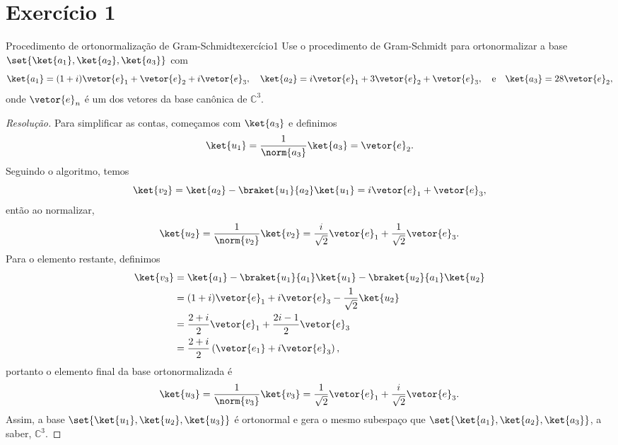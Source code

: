 \section*{Exercício 1}
\begin{exercício}{Procedimento de ortonormalização de Gram-Schmidt}{exercício1}
    Use o procedimento de Gram-Schmidt para ortonormalizar a base \(\set{\ket{a_1}, \ket{a_2}, \ket{a_3}}\) com
    \begin{equation*}
        \ket{a_1} = (1 + i)\vetor{e}_1 + \vetor{e}_2 + i \vetor{e}_3,\quad
        \ket{a_2} = i \vetor{e}_1 + 3 \vetor{e}_2 + \vetor{e}_3,\quad\text{e}\quad
        \ket{a_3} = 28 \vetor{e}_2,
    \end{equation*}
    onde \(\vetor{e}_n\) é um dos vetores da base canônica de \(\mathbb{C}^3\).
\end{exercício}
\begin{proof}[Resolução]
    Para simplificar as contas, começamos com \(\ket{a_3}\) e definimos
    \begin{equation*}
        \ket{u_1} = \frac{1}{\norm{a_3}} \ket{a_3} = \vetor{e}_2.
    \end{equation*}
    Seguindo o algoritmo, temos
    \begin{equation*}
        \ket{v_2} = \ket{a_2} - \braket{u_1}{a_2}\ket{u_1} = i \vetor{e}_1 + \vetor{e}_3,
    \end{equation*}
    então ao normalizar,
    \begin{equation*}
        \ket{u_2} = \frac{1}{\norm{v_2}}\ket{v_2} = \frac{i}{\sqrt{2}} \vetor{e}_1 + \frac1{\sqrt{2}}\vetor{e}_3.
    \end{equation*}
    Para o elemento restante, definimos
    \begin{align*}
        \ket{v_3} &= \ket{a_1} - \braket{u_1}{a_1}\ket{u_1} - \braket{u_2}{a_1}\ket{u_2}\\
                  &= (1 + i)\vetor{e}_1 + i \vetor{e}_3 - \frac{1}{\sqrt{2}}\ket{u_2}\\
                  &= \frac{2 + i}{2}\vetor{e}_1 + \frac{2i - 1}{2}\vetor{e}_3\\
                  &= \frac{2 + i}{2}\left(\vetor{e_1} + i \vetor{e}_3\right),
    \end{align*}
    portanto o elemento final da base ortonormalizada é
    \begin{equation*}
        \ket{u_3} = \frac{1}{\norm{v_3}} \ket{v_3} = \frac{1}{\sqrt{2}}\vetor{e}_1 + \frac{i}{\sqrt{2}} \vetor{e}_3.
    \end{equation*}
    Assim, a base \(\set{\ket{u_1}, \ket{u_2}, \ket{u_3}}\) é ortonormal e gera o mesmo subespaço que \(\set{\ket{a_1}, \ket{a_2}, \ket{a_3}}\), a saber, \(\mathbb{C}^3\).
\end{proof}
